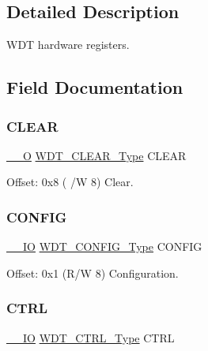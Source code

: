 \subsection{Detailed Description}
W\+DT hardware registers. 

\subsection{Field Documentation}
\mbox{\label{struct_wdt_a28c7a28f221d9f2da9d1ce57fff4ea49}} 
\subsubsection{\texorpdfstring{CLEAR}{CLEAR}}
{\footnotesize\ttfamily \mbox{\hyperlink{core__cm0plus_8h_a7e25d9380f9ef903923964322e71f2f6}{\+\_\+\+\_\+O}} \mbox{\hyperlink{union_w_d_t___c_l_e_a_r___type}{W\+D\+T\+\_\+\+C\+L\+E\+A\+R\+\_\+\+Type}} C\+L\+E\+AR}



Offset\+: 0x8 ( /W 8) Clear. 

\mbox{\label{struct_wdt_a06e276b8f30dca80ed9422ef08622536}} 
\subsubsection{\texorpdfstring{CONFIG}{CONFIG}}
{\footnotesize\ttfamily \mbox{\hyperlink{core__cm0plus_8h_aec43007d9998a0a0e01faede4133d6be}{\+\_\+\+\_\+\+IO}} \mbox{\hyperlink{union_w_d_t___c_o_n_f_i_g___type}{W\+D\+T\+\_\+\+C\+O\+N\+F\+I\+G\+\_\+\+Type}} C\+O\+N\+F\+IG}



Offset\+: 0x1 (R/W 8) Configuration. 

\mbox{\label{struct_wdt_abcd6721909c6064d79fc516be6d584b7}} 
\subsubsection{\texorpdfstring{CTRL}{CTRL}}
{\footnotesize\ttfamily \mbox{\hyperlink{core__cm0plus_8h_aec43007d9998a0a0e01faede4133d6be}{\+\_\+\+\_\+\+IO}} \mbox{\hyperlink{union_w_d_t___c_t_r_l___type}{W\+D\+T\+\_\+\+C\+T\+R\+L\+\_\+\+Type}} C\+T\+RL}




